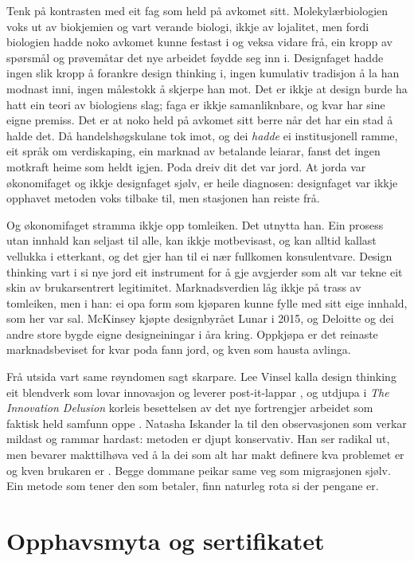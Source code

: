 Tenk på kontrasten med eit fag som held på avkomet sitt. Molekylærbiologien voks ut av biokjemien og vart verande biologi, ikkje av lojalitet, men fordi biologien hadde noko avkomet kunne festast i og veksa vidare frå, ein kropp av spørsmål og prøvemåtar det nye arbeidet føydde seg inn i. Designfaget hadde ingen slik kropp å forankre design thinking i, ingen kumulativ tradisjon å la han modnast inni, ingen målestokk å skjerpe han mot. Det er ikkje at design burde ha hatt ein teori av biologiens slag; faga er ikkje samanliknbare, og kvar har sine eigne premiss. Det er at noko held på avkomet sitt berre når det har ein stad å halde det. Då handelshøgskulane tok imot, og dei \emph{hadde} ei institusjonell ramme, eit språk om verdiskaping, ein marknad av betalande leiarar, fanst det ingen motkraft heime som heldt igjen. Poda dreiv dit det var jord. At jorda var økonomifaget og ikkje designfaget sjølv, er heile diagnosen: designfaget var ikkje opphavet metoden voks tilbake til, men stasjonen han reiste frå.

Og økonomifaget stramma ikkje opp tomleiken. Det utnytta han. Ein prosess utan innhald kan seljast til alle, kan ikkje motbevisast, og kan alltid kallast vellukka i etterkant, og det gjer han til ei nær fullkomen konsulentvare. Design thinking vart i si nye jord eit instrument for å gje avgjerder som alt var tekne eit skin av brukarsentrert legitimitet. Marknadsverdien låg ikkje på trass av tomleiken, men i han: ei opa form som kjøparen kunne fylle med sitt eige innhald, som her var sal. McKinsey kjøpte designbyrået Lunar i 2015, og Deloitte og dei andre store bygde eigne designeiningar i åra kring. Oppkjøpa er det reinaste marknadsbeviset for kvar poda fann jord, og kven som hausta avlinga.

Frå utsida vart same røyndomen sagt skarpare. Lee Vinsel kalla design thinking eit blendverk som lovar innovasjon og leverer post-it-lappar \autocite{vinsel2017boondoggle}, og utdjupa i \textit{The Innovation Delusion} korleis besettelsen av det nye fortrengjer arbeidet som faktisk held samfunn oppe \autocite{vinsel2020innovation}. Natasha Iskander la til den observasjonen som verkar mildast og rammar hardast: metoden er djupt konservativ. Han ser radikal ut, men bevarer makttilhøva ved å la dei som alt har makt definere kva problemet er og kven brukaren er \autocite{iskander2018}. Begge dommane peikar same veg som migrasjonen sjølv. Ein metode som tener den som betaler, finn naturleg rota si der pengane er.

\section{Opphavsmyta og sertifikatet}

